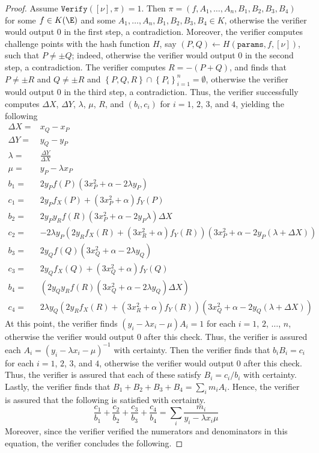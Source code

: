 \documentclass[11pt,letterpaper]{article}
\newcommand{\free}[1]{{\textcolor{red}{#1}}}
\theoremstyle{definition}
\newcommand{\6}{\mathbf}
\newcommand{\7}{\mathcal}
\begin{document}
\begin{proof}
Assume $\texttt{Verify}([\nu], \pi) = 1$. Then $\pi = (f,  A_1, \ldots, A_n, B_1, B_2, B_3, B_4)$ for some $f \in K(\E)$ and some $A_1, \ldots, A_n, B_1, B_2, B_3, B_4 \in K$, otherwise the verifier would output $0$ in the first step, a contradiction. Moreover, the verifier computes challenge points with the hash function $H$, say $(P, Q) \leftarrow H(\texttt{params}, f, [\nu])$, such that $P \neq \pm Q$; indeed, otherwise the verifier would output $0$ in the second step, a contradiction.  The verifier computes $R = -(P + Q)$, and finds that $P \neq \pm R$ and $Q \neq \pm R$ and $\left\{P, Q, R\right\} \cap \left\{P_i\right\}_{i=1}^{n} = \emptyset$, otherwise the verifier would output $0$ in the third step, a contradiction. Thus, the verifier successfully computes $\Delta X$, $\Delta Y$, $\lambda$, $\mu$, $R$, and $(b_i, c_i)$ for $i=1$, $2$, $3$, and $4$, yielding the following 
\begin{align}
\Delta X =& x_Q - x_P \\
\Delta Y =& y_Q - y_P \\
\lambda =& \frac{\Delta Y}{\Delta X} \\
\mu =& y_P - \lambda x_P \\
b_1 =& 2y_Pf(P)(3x_P^2+\alpha-2\lambda y_P) \\
c_1 =& 2y_Pf_X(P) + (3x_P^2+\alpha) f_Y(P)\\
b_2 =& 2y_Py_Rf(R)(3x_P^2+\alpha-2y_P \lambda ) \Delta X\\
c_2 =& - 2\lambda y_P(2y_Rf_X(R) + (3x_R^2+\alpha) f_Y(R))(3x_P^2+\alpha - 2y_P(\lambda + \Delta X))\\
b_3 =& 2y_Qf(Q)(3x_Q^2+\alpha - 2\lambda y_Q)\\
c_3 =& 2y_Qf_X(Q) + (3x_Q^2+\alpha) f_Y(Q) \\
b_4 =& \left(2y_Qy_Rf(R)(3x_Q^2+\alpha  - 2\lambda y_Q) \Delta X\right)\\
c_4 =& 2\lambda y_Q(2y_Rf_X(R) + (3x_R^2+\alpha)f_Y(R))(3x_Q^2+\alpha - 2y_Q(\lambda + \Delta X))
\end{align}
At this point, the verifier finds $(y_i - \lambda x_i - \mu)A_i = 1$ for each $i=1$, $2$, $\ldots$, $n$, otherwise the verifier would output $0$ after this check. Thus, the verifier is assured each $A_i = (y_i - \lambda x_i - \mu)^{-1}$ with certainty.
Then the verifier finds that $b_iB_i = c_i$ for each $i=1$, $2$, $3$, and $4$, otherwise the verifier would output $0$ after this check. Thus, the verifier is assured that each of these satisfy $B_i = c_i/b_i$ with certainty. Lastly, the verifier finds that $B_1 + B_2 + B_3 + B_4 = \sum_i m_i A_i$. Hence, the verifier is assured that the following is satisfied with certainty.
\[\frac{c_1}{b_1} + \frac{c_2}{b_2} + \frac{c_3}{b_3} + \frac{c_4}{b_4} = \sum_i \frac{m_i}{y_i-\lambda x_i \mu}\]
Moreover, since the verifier verified the numerators and denominators in this equation,  the verifier concludes the following.


\end{proof}
\end{document}
